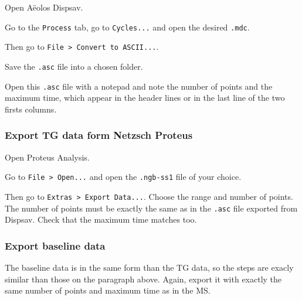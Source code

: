 \documentclass[a4paper, 11pt, raggedright, parskip]{tufte-style-article}
\begin{document}
\begin{ol}
	
\item Open Aëolos Dispsav.

\item Go to the \texttt{Process} tab, go to \texttt{Cycles...} and open the desired \texttt{.mdc}.

\item Then go to \texttt{File > Convert to ASCII...}. 

\item Save the \texttt{.asc} file into a chosen folder.

\item Open this \texttt{.asc} file with a notepad and note the number of points and the maximum time, which appear in the header lines or in the last line of the two firsts columns.

\end{ol}


\subsubsection{Export TG data form Netzsch Proteus}

\begin{ol}
	
\item Open Proteus Analysis.
	
\item Go to \texttt{File > Open...} and open the \texttt{.ngb-ss1} file of your choice.

\item Then go to \texttt{Extras > Export Data...}. Choose the range and number of points. The number of points must be exactly the same as in the \texttt{.asc} file exported from Dispsav. Check that the maximum time matches too.

\end{ol}


\subsubsection{Export baseline data}

The baseline data is in the same form than the TG data, so the steps are exacly similar than those on the paragraph above. Again, export it with exactly the same number of points and maximum time as in the MS.
\end{document}
